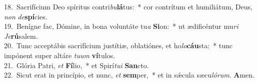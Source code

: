 {18.~}Sacrifícium Deo spíritus contri\textit{bu}\textbf{lá}tus:~* cor contrítum et humiliátum, Deus, \textit{non} \textit{de}\textbf{spí}cies.\\
{19.~}Benígne fac, Dómine, in bona voluntáte tu\textit{a} \textbf{Si}on:~* ut ædificéntur mu\textit{ri} \textit{Je}\textbf{rú}salem.\\
{20.~}Tunc acceptábis sacrifícium justítiæ, oblatiónes, et ho\textit{lo}\textbf{cáu}sta:~* tunc impónent super altáre \textit{tu}\textit{um} \textbf{ví}tulos.\\
{21.~}Glória Patri, \textit{et} \textbf{Fí}lio,~* et Spirí\textit{tu}\textit{i} \textbf{San}cto.\\
{22.~}Sicut erat in princípio, et nunc, \textit{et} \textbf{sem}per,~* et in sǽcula sæcu\textit{ló}\textit{rum}. \textbf{A}men.\\
